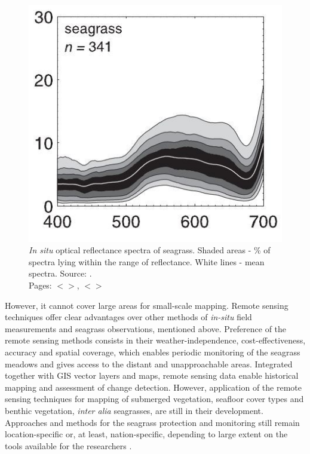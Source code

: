 \documentclass[11pt]{article}
\begin{document}
\begin{figure}
	\centering
	\includegraphics[scale=0.35]{Fig-11.jpg}
	\caption{\textit{In situ} optical reflectance spectra of seagrass. Shaded areas - \% of spectra lying within the range of reflectance. 
		White lines - mean spectra. Source: \cite{Hochberg03b}\label{Hochberg03b}. \\ Pages: $<$\pageref{page-17}$>$, $<$\pageref{page-21}$>$}
	\label{fig:13}
\end{figure}

However, it cannot cover large areas for small-scale mapping.
Remote sensing techniques offer clear advantages over other methods of \textit{in-situ} field measurements
and seagrass observations, mentioned above. Preference of the remote sensing methods consists in
their weather-independence, cost-effectiveness, accuracy and spatial coverage, which enables
periodic monitoring of the seagrass meadows and gives access to the distant and unapproachable
areas. Integrated together with \ac{GIS} vector layers and maps, remote sensing data enable historical
mapping \cite{Carter08,Ardizzone06}\label{Carter08} \label{Ardizzone06} and assessment of change detection.
However, application of the remote sensing techniques for mapping of submerged vegetation,
seafloor cover types and benthic vegetation, \textit{inter alia} seagrasses, are still in their development.
Approaches and methods for the seagrass protection and monitoring still remain location-specific or, at
least, nation-specific, depending to large extent on the tools available for the researchers \cite{Mellors09a}\label{Mellors09a}.
\end{document}
